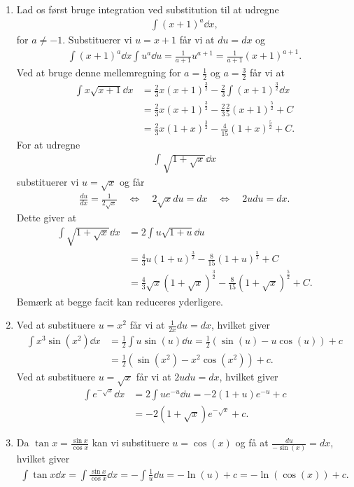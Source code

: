 \begin{enumerate}
	
	\item Lad os først bruge integration ved substitution til at udregne
	\begin{align*}
	\int (x+1)^a\dd x,
	\end{align*}
	for $a\neq -1$.
	Substituerer vi $u=x+1$ får vi at $du=dx$ og
	\begin{align*}
	\int (x+1)^a\dd x\int u^a\dd u =\frac{1}{a+1}u^{a+1}=\frac{1}{a+1}(x+1)^{a+1}.
	\end{align*}
	Ved at bruge denne mellemregning for $a=\frac{1}{2}$ og $a=\frac{3}{2}$ får vi at
	\begin{align*}
	\int x\sqrt{x+1}\dd x&=\frac{2}{3}x(x+1)^{\frac{3}{2}}-\frac{2}{3}\int(x+1)^{\frac{3}{2}}\dd x\\
	&=\frac{2}{3}x(x+1)^{\frac{3}{2}}-\frac{2}{3}\frac{2}{5} (x+1)^{\frac{5}{2}}+C\\
	&=\frac{2}{3}x(1+x)^{\frac{3}{2}}-\frac{4}{15}(1+x)^{\frac{5}{2}}+C.
	\end{align*}
	For at udregne
	\begin{align*}
	\int \sqrt{1+\sqrt{x}} \dd x
	\end{align*}
	substituerer vi $u=\sqrt{x}$ og får
	\begin{align*}
	\frac{du}{dx}=\frac{1}{2\sqrt{x}}\quad\Leftrightarrow\quad 2\sqrt{x}du=dx\quad\Leftrightarrow\quad 2udu=dx.
	\end{align*} 
	Dette giver at
	\begin{align*}
	\int \sqrt{1+\sqrt{x}} \dd x&=2\int u\sqrt{1+u}\dd u\\
	&=\frac{4}{3}u(1+u)^{\frac{3}{2}}-\frac{8}{15}(1+u)^{\frac{5}{2}}+C\\
	&=\frac{4}{3}\sqrt{x}(1+\sqrt{x})^{\frac{3}{2}}-\frac{8}{15}(1+\sqrt{x})^{\frac{5}{2}}+C.
	\end{align*}
	Bemærk at begge facit kan reduceres yderligere.
	
	\item Ved at substituere $u=x^2$ får vi at $\frac{1}{2x}du=dx$, hvilket giver
	\begin{align*}
	\int x^3\sin(x^2)\dd x&=\frac{1}{2}\int u\sin(u)\dd u=\frac{1}{2}(\sin(u)-u\cos(u))+c\\&=\frac{1}{2}(\sin(x^2)-x^2\cos(x^2))+c.
	\end{align*} 
	Ved at substituere $u=\sqrt{x}$ får vi at $2u du=dx$, hvilket giver
	\begin{align*}
	\int e^{-\sqrt{x}} \dd x&=2\int ue^{-u}\dd u=-2(1+u)e^{-u}+c\\&=-2(1+\sqrt{x})e^{-\sqrt{x}}+c.
	\end{align*}
	
	\item Da $\tan x=\frac{\sin x}{\cos x}$ kan vi substituere $u=\cos(x)$ og få at $\frac{du}{-\sin(x)}=dx$, hvilket giver
	\begin{align*}
	\int \tan x\dd x=\int \frac{\sin x}{\cos x}\dd x=-\int \frac{1}{u} \dd u=-\ln(u)+c=-\ln(\cos(x))+c.
	\end{align*}
\end{enumerate}
